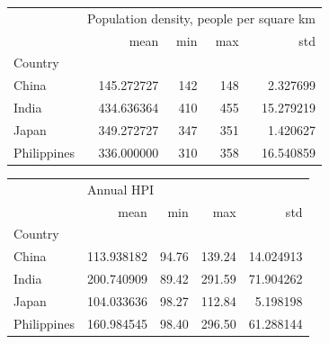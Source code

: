 \documentclass[11pt]{article}
\begin{document}
\begin{flushleft}
\vspace{2em}

\begin{tabular}{lrrrr}
\toprule
{} & \multicolumn{4}{l}{Population density, people per square km} \\
{} &                                     mean &  min &  max &        std \\
Country     &                                          &      &      &            \\
\midrule
China       &                               145.272727 &  142 &  148 &   2.327699 \\
India       &                               434.636364 &  410 &  455 &  15.279219 \\
Japan       &                               349.272727 &  347 &  351 &   1.420627 \\
Philippines &                               336.000000 &  310 &  358 &  16.540859 \\
\bottomrule
\end{tabular}

\vspace{2em}

\begin{tabular}{lrrrr}
\toprule
{} & \multicolumn{4}{l}{Annual HPI} \\
{} &        mean &    min &     max &        std \\
Country     &             &        &         &            \\
\midrule
China       &  113.938182 &  94.76 &  139.24 &  14.024913 \\
India       &  200.740909 &  89.42 &  291.59 &  71.904262 \\
Japan       &  104.033636 &  98.27 &  112.84 &   5.198198 \\
Philippines &  160.984545 &  98.40 &  296.50 &  61.288144 \\
\bottomrule
\end{tabular}
\end{flushleft}
\end{document}
